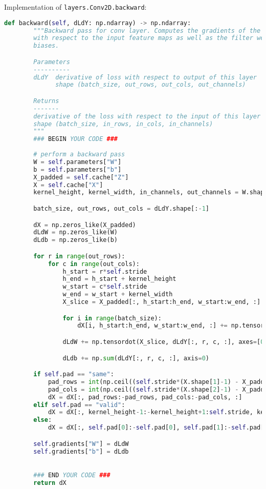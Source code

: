 Implementation of \texttt{layers.Conv2D.backward}:

\begin{lstlisting}[language=Python]
    def backward(self, dLdY: np.ndarray) -> np.ndarray:
        """Backward pass for conv layer. Computes the gradients of the output
        with respect to the input feature maps as well as the filter weights and
        biases.

        Parameters
        ----------
        dLdY  derivative of loss with respect to output of this layer
              shape (batch_size, out_rows, out_cols, out_channels)

        Returns
        -------
        derivative of the loss with respect to the input of this layer
        shape (batch_size, in_rows, in_cols, in_channels)
        """
        ### BEGIN YOUR CODE ###
        
        # perform a backward pass
        W = self.parameters["W"]
        b = self.parameters["b"]
        X_padded = self.cache["Z"]
        X = self.cache["X"]
        kernel_height, kernel_width, in_channels, out_channels = W.shape

        batch_size, out_rows, out_cols = dLdY.shape[:-1]

        dX = np.zeros_like(X_padded)
        dLdW = np.zeros_like(W)
        dLdb = np.zeros_like(b)

        for r in range(out_rows):
            for c in range(out_cols):
                h_start = r*self.stride
                h_end = h_start + kernel_height
                w_start = c*self.stride
                w_end = w_start + kernel_width
                X_slice = X_padded[:, h_start:h_end, w_start:w_end, :]

                for i in range(batch_size):
                    dX[i, h_start:h_end, w_start:w_end, :] += np.tensordot(dLdY[i, r, c, :], W, axes=[0, 3])

                dLdW += np.tensordot(X_slice, dLdY[:, r, c, :], axes=[0, 0])

                dLdb += np.sum(dLdY[:, r, c, :], axis=0)

        if self.pad == "same":
            pad_rows = int(np.ceil((self.stride*(X.shape[1]-1) - X_padded.shape[1] + kernel_height)/2))
            pad_cols = int(np.ceil((self.stride*(X.shape[2]-1) - X_padded.shape[2] + kernel_width)/2))
            dX = dX[:, pad_rows:-pad_rows, pad_cols:-pad_cols, :]
        elif self.pad == "valid":
            dX = dX[:, kernel_height-1:-kernel_height+1:self.stride, kernel_width-1:-kernel_width+1:self.stride, :]
        else:
            dX = dX[:, self.pad[0]:-self.pad[0], self.pad[1]:-self.pad[1], :]

        self.gradients["W"] = dLdW
        self.gradients["b"] = dLdb

       
        ### END YOUR CODE ###
        return dX

\end{lstlisting}


